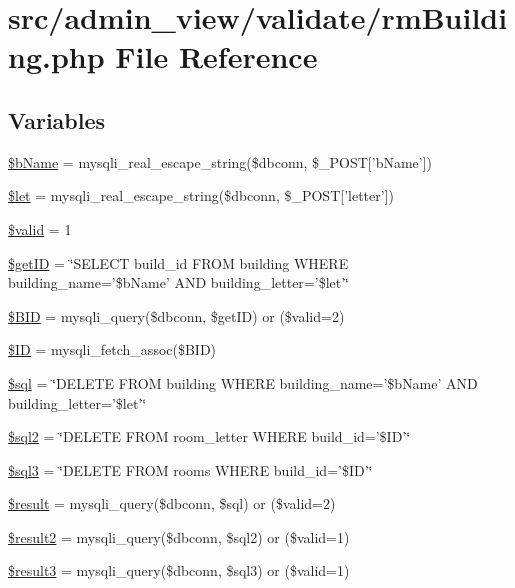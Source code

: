\hypertarget{rmBuilding_8php}{\section{src/admin\-\_\-view/validate/rm\-Building.php \-File \-Reference}
\label{rmBuilding_8php}
}
\subsection*{\-Variables}
\begin{DoxyCompactItemize}
\item 
\hyperlink{rmBuilding_8php_adda32c78f7f7aed9a0f7bb03a9198e9c}{\$b\-Name} = mysqli\-\_\-real\-\_\-escape\-\_\-string(\$dbconn, \$\-\_\-\-P\-O\-S\-T\mbox{[}'b\-Name'\mbox{]})
\item 
\hyperlink{rmBuilding_8php_ac3687b5a21519c53f240b5d1c07f997a}{\$let} = mysqli\-\_\-real\-\_\-escape\-\_\-string(\$dbconn, \$\-\_\-\-P\-O\-S\-T\mbox{[}'letter'\mbox{]})
\item 
\hyperlink{rmBuilding_8php_a0587674d27d00ef497e08e53ccf45bbb}{\$valid} = 1
\item 
\hyperlink{rmBuilding_8php_aae30003a4d3fab7dc75a19cbfddea7a8}{\$get\-I\-D} = \char`\"{}\-S\-E\-L\-E\-C\-T build\-\_\-id \-F\-R\-O\-M building \-W\-H\-E\-R\-E building\-\_\-name='\$b\-Name' \-A\-N\-D building\-\_\-letter='\$let'\char`\"{}
\item 
\hyperlink{rmBuilding_8php_a7458cf5c1cfaeb93fe055362ecff999e}{\$\-B\-I\-D} = mysqli\-\_\-query(\$dbconn, \$get\-I\-D) or (\$valid=2)
\item 
\hyperlink{rmBuilding_8php_a68d2e459193313b71494801a69ade623}{\$\-I\-D} = mysqli\-\_\-fetch\-\_\-assoc(\$\-B\-I\-D)
\item 
\hyperlink{rmBuilding_8php_a047170d6020a882807665812a27e2525}{\$sql} = \char`\"{}\-D\-E\-L\-E\-T\-E \-F\-R\-O\-M building \-W\-H\-E\-R\-E building\-\_\-name='\$b\-Name' \-A\-N\-D building\-\_\-letter='\$let'\char`\"{}
\item 
\hyperlink{rmBuilding_8php_a1ad0ffe3fa0755e56a1a6bb40c232b8a}{\$sql2} = \char`\"{}\-D\-E\-L\-E\-T\-E \-F\-R\-O\-M room\-\_\-letter \-W\-H\-E\-R\-E build\-\_\-id='\$\-I\-D'\char`\"{}
\item 
\hyperlink{rmBuilding_8php_af837618eb187a024f9473f6de320db84}{\$sql3} = \char`\"{}\-D\-E\-L\-E\-T\-E \-F\-R\-O\-M rooms \-W\-H\-E\-R\-E build\-\_\-id='\$\-I\-D'\char`\"{}
\item 
\hyperlink{rmBuilding_8php_a112ef069ddc0454086e3d1e6d8d55d07}{\$result} = mysqli\-\_\-query(\$dbconn, \$sql) or (\$valid=2)
\item 
\hyperlink{rmBuilding_8php_ae734ecc68847d4f436c60c39ec64af11}{\$result2} = mysqli\-\_\-query(\$dbconn, \$sql2) or (\$valid=1)
\item 
\hyperlink{rmBuilding_8php_a3bed351c02cbc07bce580e0044c8d37d}{\$result3} = mysqli\-\_\-query(\$dbconn, \$sql3) or (\$valid=1)
\end{DoxyCompactItemize}


